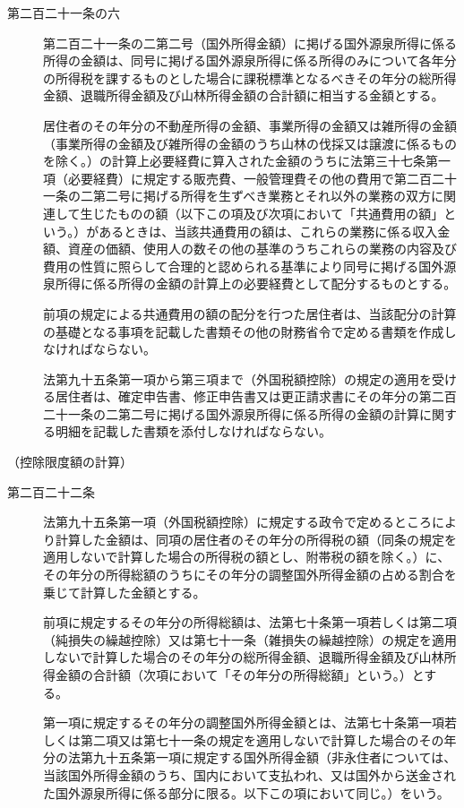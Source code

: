 \documentclass[twocolumn,a4j,10pt]{ltjtarticle}
\begin{document}
\begin{description}
\item[第二百二十一条の六]第二百二十一条の二第二号（国外所得金額）に掲げる国外源泉所得に係る所得の金額は、同号に掲げる国外源泉所得に係る所得のみについて各年分の所得税を課するものとした場合に課税標準となるべきその年分の総所得金額、退職所得金額及び山林所得金額の合計額に相当する金額とする。
\item[]居住者のその年分の不動産所得の金額、事業所得の金額又は雑所得の金額（事業所得の金額及び雑所得の金額のうち山林の伐採又は譲渡に係るものを除く。）の計算上必要経費に算入された金額のうちに法第三十七条第一項（必要経費）に規定する販売費、一般管理費その他の費用で第二百二十一条の二第二号に掲げる所得を生ずべき業務とそれ以外の業務の双方に関連して生じたものの額（以下この項及び次項において「共通費用の額」という。）があるときは、当該共通費用の額は、これらの業務に係る収入金額、資産の価額、使用人の数その他の基準のうちこれらの業務の内容及び費用の性質に照らして合理的と認められる基準により同号に掲げる国外源泉所得に係る所得の金額の計算上の必要経費として配分するものとする。
\item[]前項の規定による共通費用の額の配分を行つた居住者は、当該配分の計算の基礎となる事項を記載した書類その他の財務省令で定める書類を作成しなければならない。
\item[]法第九十五条第一項から第三項まで（外国税額控除）の規定の適用を受ける居住者は、確定申告書、修正申告書又は更正請求書にその年分の第二百二十一条の二第二号に掲げる国外源泉所得に係る所得の金額の計算に関する明細を記載した書類を添付しなければならない。
\end{description}
\noindent\hspace{10pt}（控除限度額の計算）
\begin{description}
\item[第二百二十二条]法第九十五条第一項（外国税額控除）に規定する政令で定めるところにより計算した金額は、同項の居住者のその年分の所得税の額（同条の規定を適用しないで計算した場合の所得税の額とし、附帯税の額を除く。）に、その年分の所得総額のうちにその年分の調整国外所得金額の占める割合を乗じて計算した金額とする。
\item[]前項に規定するその年分の所得総額は、法第七十条第一項若しくは第二項（純損失の繰越控除）又は第七十一条（雑損失の繰越控除）の規定を適用しないで計算した場合のその年分の総所得金額、退職所得金額及び山林所得金額の合計額（次項において「その年分の所得総額」という。）とする。
\item[]第一項に規定するその年分の調整国外所得金額とは、法第七十条第一項若しくは第二項又は第七十一条の規定を適用しないで計算した場合のその年分の法第九十五条第一項に規定する国外所得金額（非永住者については、当該国外所得金額のうち、国内において支払われ、又は国外から送金された国外源泉所得に係る部分に限る。以下この項において同じ。）をいう。
\end{description}
\end{document}
